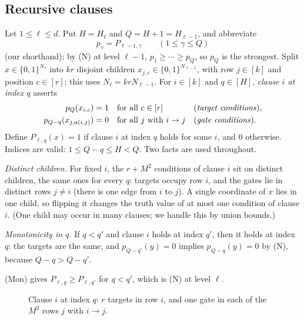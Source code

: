 \documentclass[11pt]{article}
\theoremstyle{definition}
\theoremstyle{remark}
\begin{document}
\subsection{Recursive clauses}
Let \(1\le\ell\le d\). Put \(H=H_\ell\) and \(Q=H+1=H_{\ell-1}\), and
abbreviate
\[
 p_\gamma=P_{\ell-1,\gamma}\qquad(1\le\gamma\le Q)
\]
(our shorthand); by (N) at level $\ell-1$, $p_1\ge\cdots\ge p_Q$, so $p_Q$ is
the strongest. Split \(x\in\{0,1\}^{N_\ell}\) into \(kr\) disjoint children
\(x_{j,c}\in\{0,1\}^{N_{\ell-1}}\), with row \(j\in[k]\) and position
\(c\in[r]\); this uses $N_\ell=krN_{\ell-1}$. For $i\in[k]$ and \(q\in[H]\),
\emph{clause \(i\) at index \(q\)} asserts
\begin{equation}\label{eq:predicate-definition}
 \begin{aligned}
 p_Q(x_{i,c})&=1 &&\text{for all }c\in[r] &&\text{(\emph{target conditions})},\\
 p_{Q-q}(x_{j,a(i,j)})&=0 &&\text{for all }j\text{ with }i\to j &&\text{(\emph{gate conditions})}.
 \end{aligned}
\end{equation}
Define \(P_{\ell,q}(x)=1\) if clause $i$ at index $q$ holds for some $i$, and
$0$ otherwise. Indices are valid: \(1\le Q-q\le H<Q\). Two facts are used
throughout.
\begin{description}[leftmargin=*,itemsep=1pt]
\item[\textup{(DC)}] \emph{Distinct children.} For fixed $i$, the $r+M^2$
 conditions of clause $i$ sit on distinct children, the same ones for every
 $q$: targets occupy row $i$, and the gates lie in distinct rows $j\ne i$
 (there is one edge from $i$ to $j$). A single coordinate of $x$ lies in one
 child, so flipping it changes the truth value of at most one condition of
 clause $i$. (One child may occur in many clauses; we handle this by union
 bounds.)
\item[\textup{(Mon)}] \emph{Monotonicity in $q$.} If $q<q'$ and clause $i$
 holds at index $q'$, then it holds at index $q$: the targets are the same,
 and $p_{Q-q'}(y)=0$ implies $p_{Q-q}(y)=0$ by (N), because $Q-q>Q-q'$.
\end{description}
(Mon) gives $P_{\ell,q}\ge P_{\ell,q'}$ for $q<q'$, which is (N) at level
$\ell$.

\begin{figure}[htbp]
\centering
{}
\caption{Clause $i$ at index $q$: $r$ targets in row $i$, and one gate in each
of the $M^2$ rows $j$ with $i\to j$.}
\label{fig:clause}
\end{figure}
\end{document}
